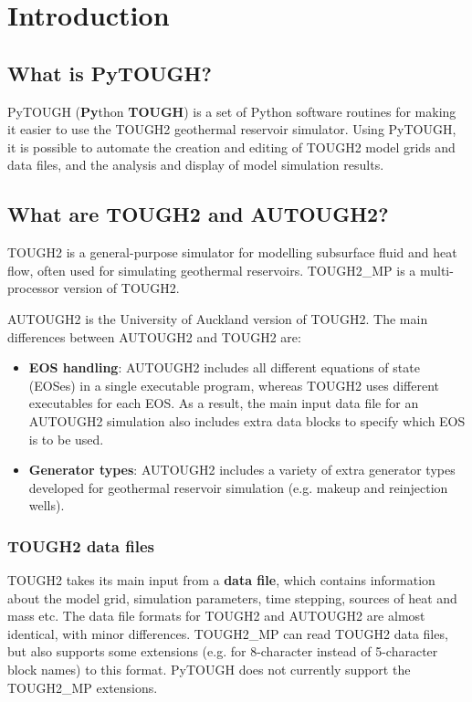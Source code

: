 \chapter{Introduction}

\section{What is PyTOUGH?}

PyTOUGH (\textbf{Py}thon \textbf{TOUGH}) is a set of Python software routines for making it easier to use the TOUGH2 geothermal reservoir simulator. Using PyTOUGH, it is possible to automate the creation and editing of TOUGH2 model grids and data files, and the analysis and display of model simulation results.

\section{What are TOUGH2 and AUTOUGH2?}

TOUGH2 \citep{tough2} is a general-purpose simulator for modelling subsurface fluid and heat flow, often used for simulating geothermal reservoirs.  TOUGH2\_MP \citep{tough2mp} is a multi-processor version of TOUGH2.

AUTOUGH2 is the University of Auckland version of TOUGH2.  The main differences between AUTOUGH2 and TOUGH2 are:

\begin{itemize}
  \item \textbf{EOS handling}: AUTOUGH2 includes all different equations of state (EOSes) in a single executable program, whereas TOUGH2 uses different executables for each EOS.  As a result, the main input data file for an AUTOUGH2 simulation also includes extra data blocks to specify which EOS is to be used.
  \item \textbf{Generator types}: AUTOUGH2 includes a variety of extra generator types developed for geothermal reservoir simulation (e.g. makeup and reinjection wells).
\end{itemize}

\subsection{TOUGH2 data files}

TOUGH2 takes its main input from a \textbf{data file}, which contains information about the model grid, simulation parameters, time stepping, sources of heat and mass etc.  The data file formats for TOUGH2 and AUTOUGH2 are almost identical, with minor differences.  TOUGH2\_MP can read TOUGH2 data files, but also supports some extensions (e.g. for 8-character instead of 5-character block names) to this format.  PyTOUGH does not currently support the TOUGH2\_MP extensions.


